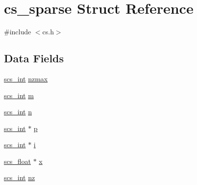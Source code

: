 \hypertarget{structcs__sparse}{\section{cs\-\_\-sparse Struct Reference}
\label{structcs__sparse}
}


{\ttfamily \#include $<$cs.\-h$>$}

\subsection*{Data Fields}
\begin{DoxyCompactItemize}
\item 
\hyperlink{glbopts_8h_a23c48a83ce0c58783595ad45ffcaf76b}{scs\-\_\-int} \hyperlink{structcs__sparse_acb1df1296140caee949e4b4bf6f01f94}{nzmax}
\item 
\hyperlink{glbopts_8h_a23c48a83ce0c58783595ad45ffcaf76b}{scs\-\_\-int} \hyperlink{structcs__sparse_a7d244d380bc6ab062bb884d1c36a7401}{m}
\item 
\hyperlink{glbopts_8h_a23c48a83ce0c58783595ad45ffcaf76b}{scs\-\_\-int} \hyperlink{structcs__sparse_aab8a2d51b682f3d6212ec490af5a7d47}{n}
\item 
\hyperlink{glbopts_8h_a23c48a83ce0c58783595ad45ffcaf76b}{scs\-\_\-int} $\ast$ \hyperlink{structcs__sparse_ae1a9a1a057f1c130edc32b47bcb104ea}{p}
\item 
\hyperlink{glbopts_8h_a23c48a83ce0c58783595ad45ffcaf76b}{scs\-\_\-int} $\ast$ \hyperlink{structcs__sparse_a4221c62923cd9aa912ea339d8a310c47}{i}
\item 
\hyperlink{glbopts_8h_ad37836e6404bb2c3ae8adcc6290699b9}{scs\-\_\-float} $\ast$ \hyperlink{structcs__sparse_a2dd17349e264aefa12ae346537dfa529}{x}
\item 
\hyperlink{glbopts_8h_a23c48a83ce0c58783595ad45ffcaf76b}{scs\-\_\-int} \hyperlink{structcs__sparse_abed54d16d9b00a218a12fdd8093a8d8d}{nz}
\end{DoxyCompactItemize}


